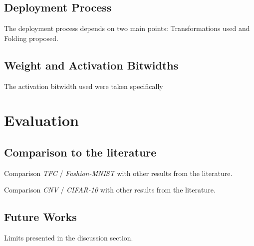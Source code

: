 
\subsection{Deployment Process}

The deployment process depends on two main points: Transformations used and Folding proposed.


\subsection{Weight and Activation Bitwidths}

The activation bitwidth used were taken specifically


\section{Evaluation}


\subsection{Comparison to the literature}

Comparison \emph{TFC} / \emph{Fashion-MNIST} with other results from the literature.

Comparison \emph{CNV} / \emph{CIFAR-10} with other results from the literature.

\subsection{Future Works}

Limits presented in the discussion section.
